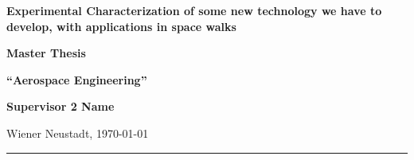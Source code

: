\begin{titlepage}
  
    \centering

    
      \begin{framed}
        \LARGE
        \vspace{1cm}
        \textbf{Experimental Characterization of some new technology we have to develop, with applications in space walks}
        \vspace{1cm}
      \end{framed}

      \LARGE
      \vspace{.7cm}
      \textbf{Master Thesis}

      \vspace{1.0cm}


      \vspace{1.0cm}


      \textbf{``Aerospace Engineering''}

      \vspace{2.5cm}
      \textbf{\LARGE Supervisor 2 Name}

      \vspace{\fill}
      \normalsize
      \raggedright Wiener Neustadt, \today
      
      \rule{\textwidth}{.5pt}
      
\end{titlepage}